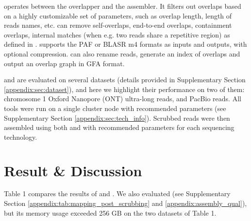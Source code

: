 \documentclass[./main.tex]{subfiles}
\begin{document}
\textbf{\fpa} operates between the overlapper and the assembler. It filters out overlaps based on a highly customizable set of parameters, such as overlap length, length of reads names, etc. \fpa can remove self-overlaps, end-to-end overlaps, containment overlaps, internal matches (when e.g. two reads share a repetitive region) as defined in \citep{minimap}. 
\fpa supports the PAF or BLASR m4 formats as inputs and outputs, with optional compression. %
\fpa can also rename reads, generate an index of overlaps and output an overlap graph in GFA format.




\yacrd and \fpa are evaluated on several datasets (details provided in Supplementary Section \ref{appendix:sec:dataset}), and here we highlight their performance on two of them: 
\hsapiens chromosome 1 Oxford Nanopore (ONT) ultra-long reads, and \celegans PacBio reads.
All tools were run on a single cluster node %
 with recommended parameters (see Supplementary Section \ref{appendix:sec:tech_info}). Scrubbed reads were then assembled using both \miniasm and \wtdbg with recommended parameters for each sequencing technology. 


\section{Result \& Discussion}

Table 1 compares the results of \textbf{\yacrd} and \dascrubber. 
We also evaluated \miniscrub (see Supplementary Section \ref{appendix:tab:mapping_post_scrubbing} and \ref{appendix:assembly_qual}), but its memory usage exceeded 256 GB on the two datasets of Table 1. %
\end{document}
